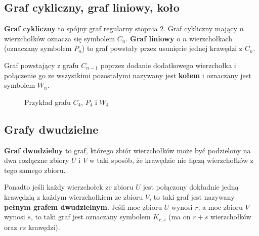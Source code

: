 \subsection*{Graf cykliczny, graf liniowy, koło}

\textbf{Graf cykliczny} to spójny graf regularny stopnia 2. Graf cykliczny mający $n$ wierzchołków oznacza się symbolem $C_n$. \textbf{Graf liniowy} o $n$ wierzchołkach (oznaczany symbolem $P_n$) to graf powstały przez usunięcie jednej krawędzi z $C_n$.

Graf powstający z grafu $C_{n-1}$ poprzez dodanie dodatkowego wierzchołka i połączenie go ze wszystkimi pozostałymi nazywany jest \textbf{kołem} i oznaczany jest symbolem $W_n$. 

\begin{figure}[h]
\centering
{}
\captionsetup{justification=centering}
\caption{Przykład grafu $C_4$, $P_4$ i $W_4$} \label{fig:cycle-graph-example}
\end{figure}

\subsection*{Grafy dwudzielne}

\textbf{Graf dwudzielny} to graf, którego zbiór wierzchołków może być podzielony na dwa rozłączne zbiory $U$ i $V$ w taki sposób, że krawędzie nie łączą wierzchołków z tego samego zbioru. 

Ponadto jeśli każdy wierzchołek ze zbioru $U$ jest połączony dokładnie jedną krawędzią z każdym wierzchołkiem ze zbioru $V$, to taki graf jest nazywany \textbf{pełnym grafem dwudzielnym}. Jeśli moc zbioru $U$ wynosi $r$, a moc zbioru $V$ wynosi $s$, to taki graf jest oznaczany symbolem $K_{r,s}$ (ma on $r+s$ wierzchołków oraz $rs$ krawędzi).

